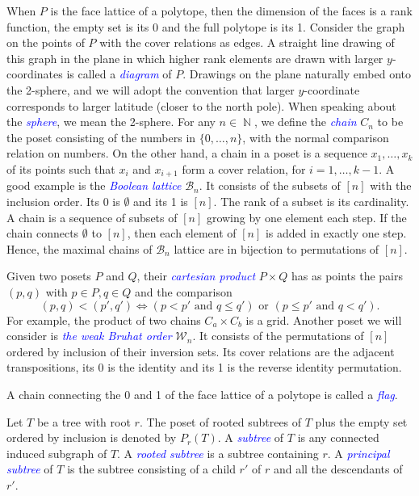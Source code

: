 \documentclass[fontsize=11pt,a4paper,DIV=12]{scrartcl}
\newcommand{\defn}[1]{\textsl{\textcolor{Blue}{#1}}}
\DeclareMathOperator{\N}{\mathbb{N}}
\begin{document}
When $P$ is the face lattice of a polytope, then the dimension of the faces is a rank function, the empty set is its 0 and the full polytope is its 1.
Consider the graph on the points of $P$ with the cover relations as edges. A straight line drawing of this graph in the plane in which higher rank elements are drawn with larger $y$-coordinates is called a \defn{diagram} of $P$. Drawings on the plane naturally embed onto the 2-sphere, and we will adopt the convention that larger $y$-coordinate corresponds to larger latitude (closer to the north pole). When speaking about the \defn{sphere}, we mean the 2-sphere. For any $n\in\N$, we define the \defn{chain} $C_n$ to be the poset consisting of the numbers in $\{0,\ldots, n\}$, with the normal comparison relation on numbers. On the other hand, a chain in a poset is a sequence $x_1,\ldots,x_k$ of its points such that $x_i$ and $x_{i+1}$ form a cover relation, for $i=1,\ldots,k-1$. A good example is the \defn{Boolean lattice} $\mathcal B_n$. It consists of the subsets of $[n]$ with the inclusion order. Its 0 is $\emptyset$ and its 1 is $[n]$. The rank of a subset is its cardinality. A chain is a sequence of subsets of $[n]$ growing by one element each step. If the chain connects $\emptyset$ to $[n]$, then each element of $[n]$ is added in exactly one step. Hence, the maximal chains of $\mathcal B_n$ lattice are in bijection to permutations of $[n]$.

Given two posets $P$ and $Q$, their \defn{cartesian product} $P\times Q$ has as points the pairs $(p,q)$ with $p\in P,q\in Q$ and the comparison
\[
    (p,q)<(p',q')\iff (p<p'\text{ and }q\le q') \text{ or } (p\le p'\text{ and }q< q').
\]
For example, the product of two chains $C_a\times C_b$ is a grid. Another poset we will consider is \defn{the weak Bruhat order} $\mathcal{W}_n$. It consists of the permutations of $[n]$ ordered by inclusion of their inversion sets. Its cover relations are the adjacent transpositions, its 0 is the identity and its 1 is the reverse identity permutation.

A chain connecting the 0 and 1 of the face lattice of a polytope is called a \defn{flag}.

Let $T$ be a tree with root $r$. The poset of rooted subtrees of $T$ plus the empty set ordered by inclusion is denoted by $P_r(T)$. A \defn{subtree} of $T$ is any connected induced subgraph of $T$. A \defn{rooted subtree} is a subtree containing $r$. A \defn{principal subtree} of $T$ is the subtree consisting of a child $r'$ of $r$ and all the descendants of $r'$.
\end{document}
